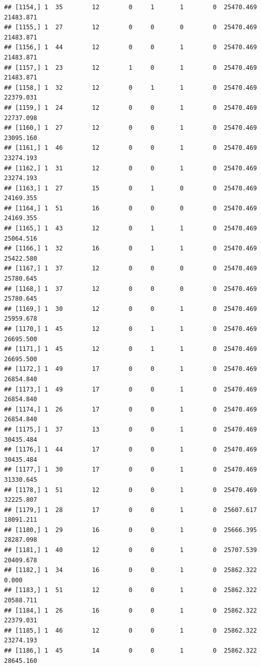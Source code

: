 \documentclass[
]{article}
\begin{document}
\begin{verbatim}
## [1154,] 1  35        12        0     1       1        0  25470.469  21483.871
## [1155,] 1  27        12        0     0       0        0  25470.469  21483.871
## [1156,] 1  44        12        0     0       1        0  25470.469  21483.871
## [1157,] 1  23        12        1     0       1        0  25470.469  21483.871
## [1158,] 1  32        12        0     1       1        0  25470.469  22379.031
## [1159,] 1  24        12        0     0       1        0  25470.469  22737.098
## [1160,] 1  27        12        0     0       1        0  25470.469  23095.160
## [1161,] 1  46        12        0     0       1        0  25470.469  23274.193
## [1162,] 1  31        12        0     0       1        0  25470.469  23274.193
## [1163,] 1  27        15        0     1       0        0  25470.469  24169.355
## [1164,] 1  51        16        0     0       0        0  25470.469  24169.355
## [1165,] 1  43        12        0     1       1        0  25470.469  25064.516
## [1166,] 1  32        16        0     1       1        0  25470.469  25422.580
## [1167,] 1  37        12        0     0       0        0  25470.469  25780.645
## [1168,] 1  37        12        0     0       0        0  25470.469  25780.645
## [1169,] 1  30        12        0     0       1        0  25470.469  25959.678
## [1170,] 1  45        12        0     1       1        0  25470.469  26695.500
## [1171,] 1  45        12        0     1       1        0  25470.469  26695.500
## [1172,] 1  49        17        0     0       1        0  25470.469  26854.840
## [1173,] 1  49        17        0     0       1        0  25470.469  26854.840
## [1174,] 1  26        17        0     0       1        0  25470.469  26854.840
## [1175,] 1  37        13        0     0       1        0  25470.469  30435.484
## [1176,] 1  44        17        0     0       1        0  25470.469  30435.484
## [1177,] 1  30        17        0     0       1        0  25470.469  31330.645
## [1178,] 1  51        12        0     0       1        0  25470.469  32225.807
## [1179,] 1  28        17        0     0       1        0  25607.617  18091.211
## [1180,] 1  29        16        0     0       1        0  25666.395  28287.098
## [1181,] 1  40        12        0     0       1        0  25707.539  20409.678
## [1182,] 1  34        16        0     0       1        0  25862.322      0.000
## [1183,] 1  51        12        0     0       1        0  25862.322  20588.711
## [1184,] 1  26        16        0     0       1        0  25862.322  22379.031
## [1185,] 1  46        12        0     0       1        0  25862.322  23274.193
## [1186,] 1  45        14        0     0       1        0  25862.322  28645.160

\end{verbatim}
\end{document}

